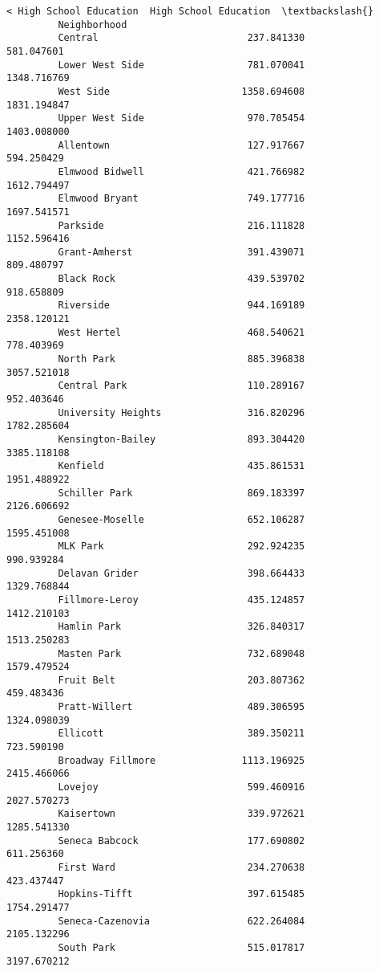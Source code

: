 \documentclass[11pt]{article}
\begin{document}
\begin{Verbatim}[commandchars=\\\{\}]
                             < High School Education  High School Education  \textbackslash{}
         Neighborhood                                                         
         Central                          237.841330             581.047601   
         Lower West Side                  781.070041            1348.716769   
         West Side                       1358.694608            1831.194847   
         Upper West Side                  970.705454            1403.008000   
         Allentown                        127.917667             594.250429   
         Elmwood Bidwell                  421.766982            1612.794497   
         Elmwood Bryant                   749.177716            1697.541571   
         Parkside                         216.111828            1152.596416   
         Grant-Amherst                    391.439071             809.480797   
         Black Rock                       439.539702             918.658809   
         Riverside                        944.169189            2358.120121   
         West Hertel                      468.540621             778.403969   
         North Park                       885.396838            3057.521018   
         Central Park                     110.289167             952.403646   
         University Heights               316.820296            1782.285604   
         Kensington-Bailey                893.304420            3385.118108   
         Kenfield                         435.861531            1951.488922   
         Schiller Park                    869.183397            2126.606692   
         Genesee-Moselle                  652.106287            1595.451008   
         MLK Park                         292.924235             990.939284   
         Delavan Grider                   398.664433            1329.768844   
         Fillmore-Leroy                   435.124857            1412.210103   
         Hamlin Park                      326.840317            1513.250283   
         Masten Park                      732.689048            1579.479524   
         Fruit Belt                       203.807362             459.483436   
         Pratt-Willert                    489.306595            1324.098039   
         Ellicott                         389.350211             723.590190   
         Broadway Fillmore               1113.196925            2415.466066   
         Lovejoy                          599.460916            2027.570273   
         Kaisertown                       339.972621            1285.541330   
         Seneca Babcock                   177.690802             611.256360   
         First Ward                       234.270638             423.437447   
         Hopkins-Tifft                    397.615485            1754.291477   
         Seneca-Cazenovia                 622.264084            2105.132296   
         South Park                       515.017817            3197.670212   
         

\end{Verbatim}
\end{document}
